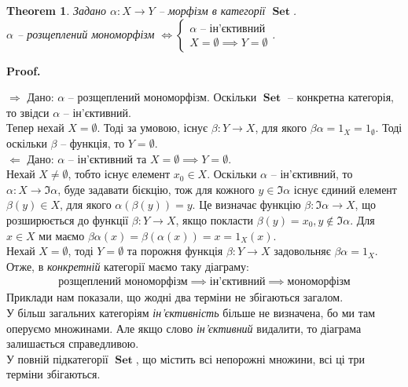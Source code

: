 \documentclass[a4paper, 10pt]{article}
\makeatletter
\def\rightproof{$\boxed{\Rightarrow}$ }
\def\leftproof{$\boxed{\Leftarrow}$ }
\theoremstyle{theoremdd}
\newtheorem{theorem}{Theorem}[subsection]
\renewenvironment{proof}[1][Proof.\\]{\par
\pushQED{\hfill \qed}%
\normalfont \topsep6\p@\@plus6\p@\relax
\trivlist
\item\relax
{\bfseries
#1\@addpunct{.}}\hspace\labelsep\ignorespaces
}{%
\popQED\endtrivlist\@endpefalse
}
\DeclareMathOperator{\Set}{\textbf{Set}}
\makeatother
\begin{document}
\begin{theorem}
Задано $\alpha \colon X \to Y$ -- морфізм в категорії $\Set$.\\
$\alpha$ -- розщеплений мономорфізм $\iff \begin{cases} \alpha \text{ -- ін'єктивний} \\ X = \emptyset \implies Y = \emptyset \end{cases}$.
\end{theorem}

\begin{proof}
\rightproof Дано: $\alpha$ -- розщеплений мономорфізм. Оскільки $\Set$ -- конкретна категорія, то звідси $\alpha$ -- ін'єктивний.\\
Тепер нехай $X = \emptyset$. Тоді за умовою, існує $\beta \colon Y \to X$, для якого $\beta \alpha = 1_X = 1_\emptyset$. Тоді оскільки $\beta$ -- функція, то $Y = \emptyset$.
\bigskip \\
\leftproof Дано: $\alpha$ -- ін'єктивний та $X = \emptyset \implies Y = \emptyset$.\\
Нехай $X \neq \emptyset$, тобто існує елемент $x_0 \in X$. Оскільки $\alpha$ -- ін'єктивний, то $\alpha \colon X \to \Im \alpha$, буде задавати бієкцію, тож для кожного $y \in \Im \alpha$ існує єдиний елемент $\beta(y) \in X$, для якого $\alpha(\beta(y)) = y$. Це визначає функцію $\beta \colon \Im \alpha \to X$, що розширюється до функції $\beta \colon Y \to X$, якщо покласти $\beta(y) = x_0, y \notin \Im \alpha$. Для $x \in X$ ми маємо $\beta \alpha(x) = \beta(\alpha(x)) = x = 1_X(x)$.\\
Нехай $X = \emptyset$, тоді $Y = \emptyset$ та порожня функція $\beta \colon Y \to X$ задовольняє $\beta \alpha = 1_X$.
\end{proof}
\noindent
Отже, в \textit{конкретній} категорії маємо таку діаграму:
\begin{align*}
\text{розщеплений мономорфізм} \implies \textit{ін'єктивний} \implies \text{мономорфізм}
\end{align*}
Приклади нам показали, що жодні два терміни не збігаються загалом.\\
У більш загальних категоріям \textit{ін'єктивність} більше не визначена, бо ми там оперуємо множинами. Але якщо слово \textit{ін'єктивний} видалити, то діаграма залишається справедливою.\\
У повній підкатегорії $\Set$, що містить всі непорожні множини, всі ці три терміни збігаються.
\end{document}
